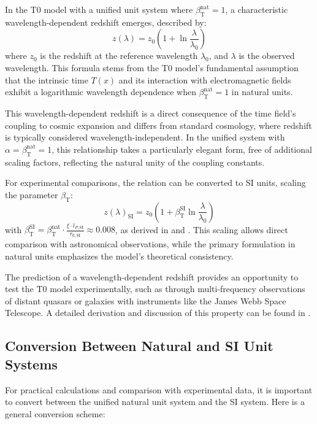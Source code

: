 \documentclass[12pt,a4paper]{article}
\newcommand{\Tfield}{T(x)}
\newcommand{\betaT}{\beta_{\text{T}}}
\begin{document}
	In the T0 model with a unified unit system where \(\betaT^{\text{nat}} = 1\), a characteristic wavelength-dependent redshift emerges, described by:
	\begin{equation}
		z(\lambda) = z_0 \left(1 + \ln \frac{\lambda}{\lambda_0}\right)
	\end{equation}
	where \(z_0\) is the redshift at the reference wavelength \(\lambda_0\), and \(\lambda\) is the observed wavelength. This formula stems from the T0 model’s fundamental assumption that the intrinsic time \(\Tfield\) and its interaction with electromagnetic fields exhibit a logarithmic wavelength dependence when \(\betaT^{\text{nat}} = 1\) in natural units.
	
	This wavelength-dependent redshift is a direct consequence of the time field’s coupling to cosmic expansion and differs from standard cosmology, where redshift is typically considered wavelength-independent. In the unified system with \(\alpha = \betaT^{\text{nat}} = 1\), this relationship takes a particularly elegant form, free of additional scaling factors, reflecting the natural unity of the coupling constants.
	
	For experimental comparisons, the relation can be converted to SI units, scaling the parameter \(\betaT\):
	\begin{equation}
		z(\lambda)_{\text{SI}} = z_0 \left(1 + \betaT^{\text{SI}} \ln \frac{\lambda}{\lambda_0}\right)
	\end{equation}
	with \(\betaT^{\text{SI}} = \betaT^{\text{nat}} \cdot \frac{\xi \cdot l_{P,\text{SI}}}{r_{0,\text{SI}}} \approx 0.008\), as derived in \cite{pascher_emergente_gravitation_2025} and \cite{pascher_params_2025}. This scaling allows direct comparison with astronomical observations, while the primary formulation in natural units emphasizes the model’s theoretical consistency.
	
	The prediction of a wavelength-dependent redshift provides an opportunity to test the T0 model experimentally, such as through multi-frequency observations of distant quasars or galaxies with instruments like the James Webb Space Telescope. A detailed derivation and discussion of this property can be found in \cite{pascher_emergente_gravitation_2025}.
	
	\subsection{Conversion Between Natural and SI Unit Systems}
	
	For practical calculations and comparison with experimental data, it is important to convert between the unified natural unit system and the SI system. Here is a general conversion scheme:
	
\end{document}
